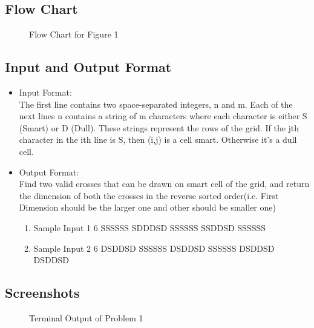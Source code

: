 \documentclass[12pt]{article}
\begin{document}
		\subsection{Flow Chart}
		
			\begin{figure}[h!]
				\centering
				\caption{Flow Chart for Figure 1}
			\end{figure}
		
		\subsection{Input and Output Format}
		
			\begin{itemize}
				\item Input Format:\\The first line contains two space-separated integers, n and m.
				Each of the next lines n contains a string of m characters where each character is either S
				(Smart) or D (Dull). These strings represent the rows of the grid. If the jth character in the ith
				line is S, then (i,j) is a cell smart. Otherwise it's a dull cell.
				\item Output Format:\\ Find two valid crosses that can be drawn on smart cell of the grid, and return the dimension
				of both the crosses in the reverse sorted order(i.e. First Dimension should be the larger one
				and other should be smaller one)
				\begin{enumerate}
					\item Sample Input 1
					 6
					\subitem SSSSSS
					\subitem SDDDSD
					\subitem SSSSSS
					\subitem SSDDSD
					\subitem SSSSSS
					\item Sample Input 2
					 6
					\subitem DSDDS​D
					\subitem SSSSSS
					\subitem DSDDSD
					\subitem SSSSSS
					\subitem DSDDSD
					\subitem DSDDSD
				\end{enumerate}

			\end{itemize}

		\subsection{Screenshots}
		
			\begin{figure}[h!]
				\centering
				\caption{Terminal Output of Problem 1}
			\end{figure}
	\newpage
\end{document}
